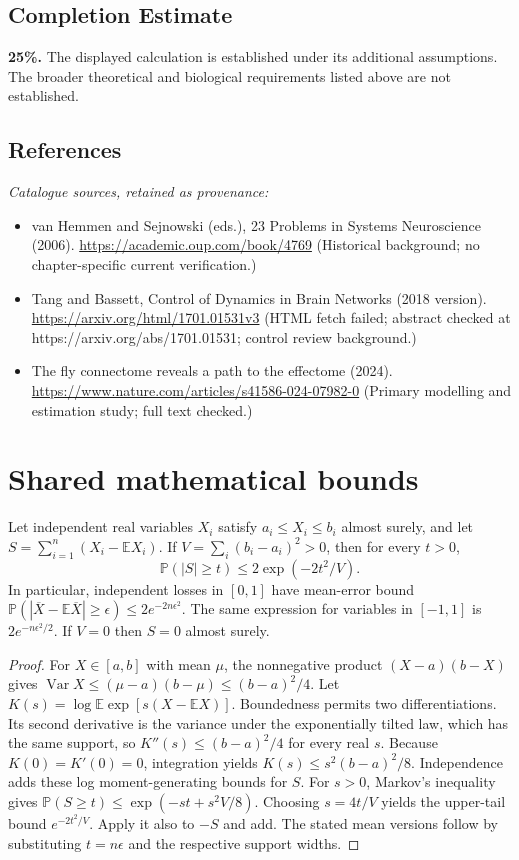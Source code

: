 \documentclass[11pt]{article}
\begin{document}
\subsection{Completion Estimate}
\textbf{25\%.} The displayed calculation is established under its additional assumptions. The broader theoretical and biological requirements listed above are not established.
\subsection{References}
\noindent\emph{Catalogue sources, retained as provenance:}
\begin{itemize}
\item van Hemmen and Sejnowski (eds.), 23 Problems in Systems Neuroscience (2006). \url{https://academic.oup.com/book/4769} (Historical background; no chapter-specific current verification.)
\item Tang and Bassett, Control of Dynamics in Brain Networks (2018 version). \url{https://arxiv.org/html/1701.01531v3} (HTML fetch failed; abstract checked at https://arxiv.org/abs/1701.01531; control review background.)
\item The fly connectome reveals a path to the effectome (2024). \url{https://www.nature.com/articles/s41586-024-07982-0} (Primary modelling and estimation study; full text checked.)
\end{itemize}




\section{Shared mathematical bounds}\label{app:bounds}
\begin{lemma}\label{lem:bounded}
Let independent real variables $X_i$ satisfy $a_i\leq X_i\leq b_i$ almost surely,
and let $S=\sum_{i=1}^n(X_i-\mathbb{E} X_i)$. If
$V=\sum_i(b_i-a_i)^2>0$, then for every $t>0$,
\[
 \mathbb{P}(|S|\geq t)\leq 2\exp(-2t^2/V).
\]
In particular, independent losses in $[0,1]$ have mean-error bound
$\mathbb{P}(|\overline X-\mathbb{E}\overline X|\geq\epsilon)
\leq2e^{-2n\epsilon^2}$. The same expression for variables in $[-1,1]$
is $2e^{-n\epsilon^2/2}$. If $V=0$ then $S=0$ almost surely.
\end{lemma}
\begin{proof}
For $X\in[a,b]$ with mean $\mu$, the nonnegative product
$(X-a)(b-X)$ gives
$\operatorname{Var} X\leq(\mu-a)(b-\mu)\leq(b-a)^2/4$.
Let $K(s)=\log\mathbb{E}\exp[s(X-\mathbb{E} X)]$.
Boundedness permits two differentiations. Its second derivative is the variance
under the exponentially tilted law, which has the same support, so
$K''(s)\leq(b-a)^2/4$ for every real $s$.
Because $K(0)=K'(0)=0$, integration yields
$K(s)\leq s^2(b-a)^2/8$.
Independence adds these log moment-generating bounds for $S$.
For $s>0$, Markov's inequality gives
$\mathbb{P}(S\geq t)\leq\exp(-st+s^2V/8)$.
Choosing $s=4t/V$ yields the upper-tail bound $e^{-2t^2/V}$.
Apply it also to $-S$ and add. The stated mean versions follow by substituting
$t=n\epsilon$ and the respective support widths.
\end{proof}
\end{document}
